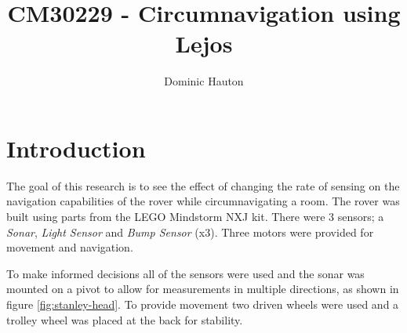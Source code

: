 \documentclass[a4paper,12pt,twocolumn]{report}
\title{CM30229 - Circumnavigation using Lejos}
\author{Dominic Hauton}
\begin{document}
\maketitle


\section{Introduction}



The goal of this research is to see the effect of changing the rate of sensing on the navigation capabilities of the rover while circumnavigating a room. The rover was built using parts from the LEGO Mindstorm NXJ kit. There were 3 sensors; a \emph{Sonar}, \emph{Light Sensor} and \emph{Bump Sensor} (x3). Three motors were provided for movement and navigation.

To make informed decisions all of the sensors were used and the sonar was mounted on a pivot to allow for measurements in multiple directions, as shown in figure \ref{fig:stanley-head}. To provide movement two driven wheels were used and a trolley wheel was placed at the back for stability.
\end{document}
